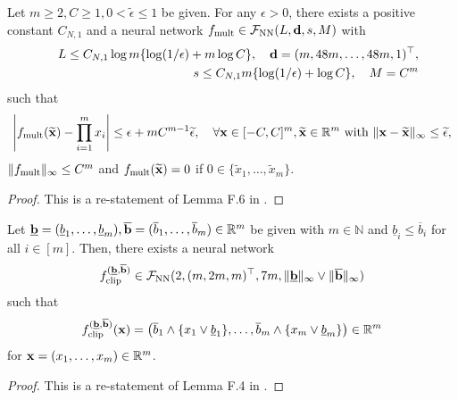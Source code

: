 \documentclass[twoside,11pt]{article}
\def\cF{\mathcal F}
\newcommand{\bb}{{\bf b}}
\newcommand{\bd}{{\bf d}}
\newcommand{\bx}{{\bf x}}
\newcommand{\bbR}{{\mathbb R}}
\newcommand{\bbN}{{\mathbb N}}
\newcommand{\bean}{\setlength\arraycolsep{1pt}\begin{eqnarray*}}
\newcommand{\eean}{\end{eqnarray*}}
\begin{document}
\begin{lemma}[Multiplication]
\label{secnn:mult}
Let $m \geq 2, C \geq 1, 0 < \widetilde \epsilon \leq 1$ be given. For any $\epsilon > 0$, there exists a positive constant $C_{N,1}$ and a neural network $f_{\rm mult} \in \cF_{\rm NN}(L,\bd,s,M)$ with 
\bean
&& L \leq C_{N,1} \log m \{ \log (1/\epsilon) + m \log C \}, \quad \bd = (m,48m,\ldots,48m,1)^{\top},
\\
&& s \leq C_{N,1} m \{ \log(1/\epsilon) +  \log C \}, \quad M = C^{m}
\eean
such that
\bean
\left\vert f_{\rm mult}(\widetilde \bx) - \prod_{i=1}^{m} x_{i} \right\vert \leq \epsilon + mC^{m-1}\widetilde \epsilon, \quad \forall \bx \in [-C,C]^{m}, \widetilde \bx \in \bbR^{m} \ {\rm with} \ \|\bx-\widetilde \bx\|_{\infty} \leq \widetilde \epsilon,
\eean
$ \| f_{\rm mult} \|_{\infty} \leq C^{m}$ and $f_{\rm mult}(\widetilde \bx) = 0$ if $0 \in \{\widetilde x_1,\ldots,\widetilde x_{m}\}$.
\end{lemma}
\begin{proof}
This is a re-statement of Lemma F.6 in \citet{oko2023diffusion}.
\end{proof}

\begin{lemma}
\label{secnn:clip}
Let $\underline{\bb} = (\underline{b}_1,\ldots,\underline{b}_m), \overline{\bb} = (\overline{b}_1,\ldots,\overline{b}_m) \in \bbR^{m}$ be given with $m \in \bbN$ and $\underline{b}_i \leq \overline{b}_i$ for all $i \in [m]$. Then, there exists a neural network 
\bean
f_{\rm clip}^{(\underline{\bb},\overline{\bb})} \in \cF_{\rm NN}(2,(m,2m,m)^{\top}, 7m, \| \underline{\bb} \|_{\infty} \vee \| \overline{\bb} \|_{\infty} )
\eean
such that 
\bean
f_{\rm clip}^{(\underline{\bb},\overline{\bb})} (\bx) = \left( \overline{b}_1 \wedge \{x_1 \vee \underline{b}_1 \}, \ldots, \overline{b}_m \wedge \{ x_m \vee \underline{b}_m \}  \right) \in \bbR^{m}
\eean
for $\bx = (x_1,\ldots,x_m) \in \bbR^{m}$.
\end{lemma}
\begin{proof}
This is a re-statement of Lemma F.4 in \citet{oko2023diffusion}.
\end{proof}
\end{document}
